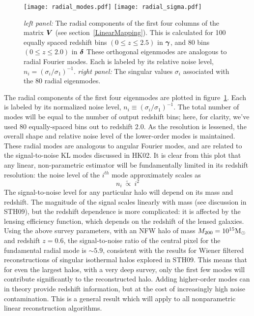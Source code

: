 \begin{figure*}[t]
 \centering
 \texttt{[image: radial\_modes.pdf]}
 \texttt{[image: radial\_sigma.pdf]}  
 \caption{\textit{left panel:} 
   The radial components of the first four
   columns of the matrix $\boldsymbol{V}$ (see section~\ref{LinearMapping}).
   This is calculated for 100 equally spaced redshift bins $(0\le z\le 2.5)$ 
   in $\boldsymbol{\gamma}$, and 80 bins $(0\le z\le 2.0)$ in $\boldsymbol{\delta}$
   These orthogonal eigenmodes are analogous to radial Fourier modes.  Each
   is labeled by its relative noise level, $n_i = (\sigma_i/\sigma_1)^{-1}$.
   \textit{right panel:}
   The singular values $\sigma_i$ associated with the 80 radial eigenmodes.
 \label{fig_radial_modes} }
\end{figure*} 

The radial components of the first four eigenmodes are plotted in 
figure~\ref{fig_radial_modes}.  Each is labeled by its normalized 
noise level, $n_i \equiv (\sigma_i/\sigma_1)^{-1}$.
The total number of modes will be equal to the number of output redshift 
bins; here, for clarity, we've used 80 equally-spaced bins out to redshift 2.0.
As the resolution is lessened, the overall shape and relative noise level of 
the lower-order modes is maintained.
These radial modes are analogous to angular Fourier modes,
and are related to the signal-to-noise KL modes discussed in HK02.
It is clear from this plot that any linear, non-parametric
estimator will be fundamentally limited in its redshift resolution: 
the noise level of the $i^{th}$ mode approximately scales as
\begin{equation}
  n_i\ \widetilde{\propto}\ i^2
\end{equation}
The signal-to-noise level for any particular halo will depend on
its mass and redshift. The magnitude of the signal
scales linearly with mass (see discussion in STH09), 
but the redshift dependence is more complicated: it is
affected by the lensing efficiency function, which depends on the redshift
of the lensed galaxies.  Using the above survey parameters, with an NFW halo 
of mass $M_{200} = 10^{15} \rm{M_\odot}$ and redshift $z=0.6$, 
the signal-to-noise ratio 
of the central pixel for the fundamental radial mode is $\sim 5.9$,
consistent with the results for Wiener filtered reconstructions of
singular isothermal halos explored in STH09.
This means that for even the largest halos, with a very deep survey,
only the first few modes will contribute significantly 
to the reconstructed halo.  Adding higher-order modes can in theory 
provide redshift information, but at the cost of increasingly high 
noise contamination. This is a general result which will apply to all 
nonparametric linear reconstruction algorithms.

